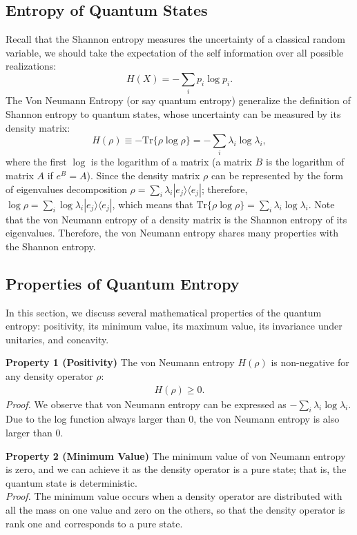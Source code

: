 \subsection{Entropy of Quantum States}
Recall that the Shannon entropy measures the uncertainty of a classical random variable, we should take the expectation of the self information over all possible realizations:
\begin{equation*}
H(X) = -\sum_i p_i \log p_i.
\end{equation*}
The Von Neumann Entropy (or say quantum entropy) generalize the definition of Shannon entropy to quantum states, whose uncertainty can be measured by its density matrix:
\begin{equation*}
H(\rho) \equiv - \text{Tr} \{ \rho \log \rho \} = -\sum_{i} \lambda_i \log \lambda_i,
\end{equation*}
where the first $\log$ is the logarithm of a matrix (a matrix $B$ is the logarithm of matrix $A$ if $e^B = A$).
Since the density matrix $\rho$ can be represented by the form of eigenvalues decomposition $\rho = \sum_{i} \lambda_i |e_j\rangle \langle e_j|$; therefore, $\log \rho = \sum_{i} \log \lambda_i |e_j\rangle \langle e_j|$, which means that $\text{Tr} \{ \rho \log \rho \} = \sum_{i} \lambda_i \log \lambda_i$.
Note that the von Neumann entropy of a density matrix is the Shannon entropy of its eigenvalues. Therefore, the von Neumann entropy shares many properties with the Shannon entropy.

\subsection{Properties of  Quantum Entropy}
In this section, we discuss several mathematical properties of the quantum entropy: positivity, its minimum value, its maximum value, its invariance under unitaries, and concavity.

\textbf{Property 1 (Positivity)} The von Neumann entropy $H(\rho)$ is non-negative for any density operator $\rho$:
\begin{align*}
H(\rho) \geq 0.
\end{align*}
\textit{Proof.} We observe that von Neumann entropy can be expressed as  $-\sum_{i} \lambda_i \log \lambda_i$. Due to the log function always larger than 0, the von Neumann entropy is also larger than 0.

\textbf{Property 2 (Minimum Value)}
The minimum value of von Neumann entropy is zero, and we can achieve it as the density operator is a pure state; that is, the quantum state is deterministic. \\
\textit{Proof.} The minimum value occurs when a density operator are distributed with all the mass on one value and zero on the others, so that the density operator is rank one and corresponds to a pure state.

